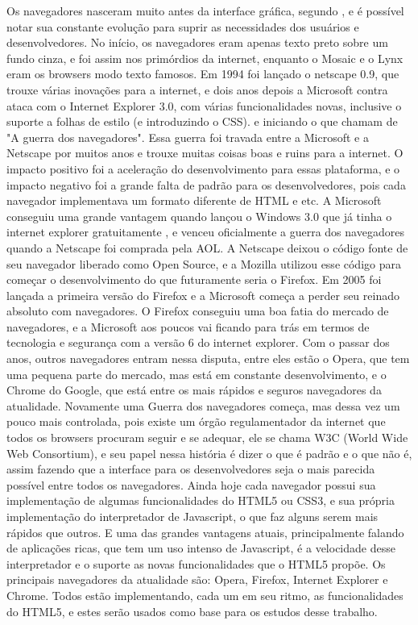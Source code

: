 Os navegadores nasceram muito antes da interface gráfica, segundo
\cite{robbins2006web}, e é possível notar sua constante evolução para
suprir as necessidades dos usuários e desenvolvedores. No início, os
navegadores eram apenas texto preto sobre um fundo cinza, e foi assim
nos primórdios da internet, enquanto o Mosaic e o Lynx eram os
browsers modo texto famosos. Em 1994 foi lançado o netscape 0.9, que
trouxe várias inovações para a internet, e dois anos depois a
Microsoft contra ataca com o Internet Explorer 3.0, com várias
funcionalidades novas, inclusive o suporte a folhas de estilo (e
introduzindo o CSS). e iniciando o que chamam de "A guerra dos
navegadores". Essa guerra foi travada entre a Microsoft e a Netscape
por muitos anos e trouxe muitas coisas boas e ruins para a internet. O
impacto positivo foi a aceleração do desenvolvimento para essas
plataforma, e o impacto negativo foi a grande falta de padrão para os
desenvolvedores, pois cada navegador implementava um formato diferente
de HTML e etc. A Microsoft conseguiu uma grande vantagem quando lançou
o Windows 3.0 que já tinha o internet explorer gratuitamente
\cite{asleson2006foundations}, e venceu oficialmente a guerra dos navegadores quando a
Netscape foi comprada pela AOL. A Netscape deixou o código fonte
de seu navegador liberado como Open Source, e a Mozilla utilizou esse
código para começar o desenvolvimento do que futuramente seria o
Firefox.
Em 2005 foi lançada a primeira versão do Firefox e a Microsoft começa
a perder seu reinado absoluto com navegadores. O Firefox conseguiu uma
boa fatia do mercado de navegadores, e a Microsoft aos poucos vai
ficando para trás em termos de tecnologia e segurança com a versão 6
do internet explorer.
Com o passar dos anos, outros navegadores entram nessa disputa, entre
eles estão o Opera, que tem uma pequena parte do mercado, mas está em
constante desenvolvimento, e o Chrome do Google, que está entre os
mais rápidos e seguros navegadores da atualidade.
Novamente uma Guerra dos navegadores começa, mas dessa vez um pouco
mais controlada, pois existe um órgão regulamentador da internet que
todos os browsers procuram seguir e se adequar, ele se chama W3C
(World Wide Web Consortium), e seu papel nessa história é dizer o que
é padrão e o que não é, assim fazendo que a interface para os
desenvolvedores seja o mais parecida possível entre todos os
navegadores.
Ainda hoje cada navegador possui sua implementação de algumas
funcionalidades do HTML5 ou CSS3, e sua própria implementação do
interpretador de Javascript, o que faz alguns serem mais rápidos que
outros. E uma das grandes vantagens atuais, principalmente falando de
aplicações ricas, que tem um uso intenso de Javascript, é a velocidade
desse interpretador e o suporte as novas funcionalidades que o HTML5
propõe.
Os principais navegadores da atualidade são: Opera, Firefox, Internet
Explorer e Chrome. Todos estão implementando, cada um em seu ritmo, as
funcionalidades do HTML5, e estes serão usados como base para os
estudos desse trabalho.

